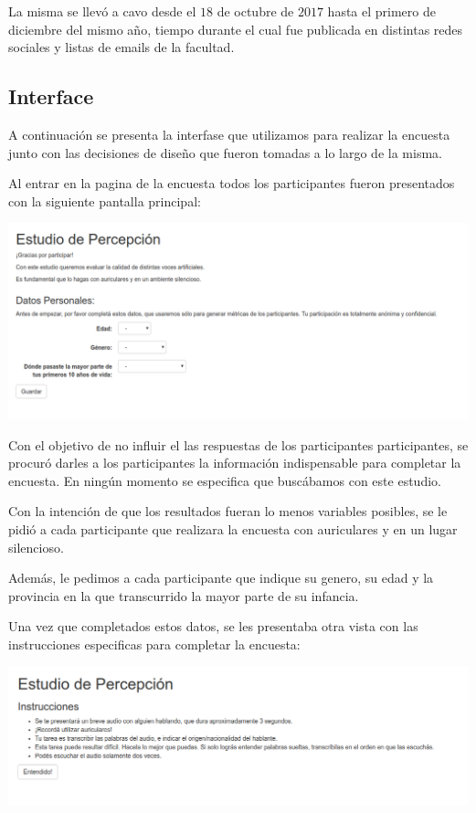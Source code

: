 La misma se llevó a cavo desde el $18$ de octubre de $2017$ hasta el primero de diciembre del mismo año, tiempo durante el cual fue publicada en distintas redes sociales y listas de emails de la facultad.

\subsection{Interface}

A continuación se presenta la interfase que utilizamos para realizar la encuesta junto con las decisiones de diseño que fueron tomadas a lo largo de la misma. 

Al entrar en la pagina de la encuesta todos los participantes fueron presentados con la siguiente pantalla principal:

\begin{center}
\includegraphics[scale=0.4]{estudio_online/estudio1.png}
\end{center}

Con el objetivo de no influir el las respuestas de los participantes participantes, se procuró darles a los participantes la información indispensable para completar la encuesta. En ningún momento se especifica que buscábamos con este estudio.

Con la intención de que los resultados fueran lo menos variables posibles, se le pidió a cada participante que realizara la encuesta con auriculares y en un lugar silencioso.

Además, le pedimos a cada participante que indique su genero, su edad y la provincia en la que transcurrido la mayor parte de su infancia.

Una vez que completados estos datos, se les presentaba otra vista con las instrucciones especificas para completar la encuesta:

\begin{center}
\includegraphics[scale=0.4]{estudio_online/estudio2.png}
\end{center}

